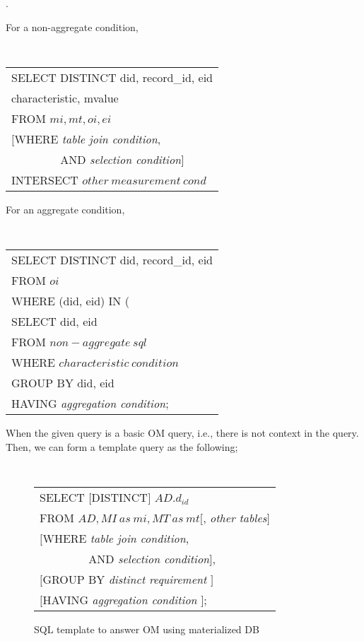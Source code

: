 .


For a non-aggregate condition,

{\tt
\begin{tabular}{l}
SELECT DISTINCT did, record\_id, eid \\
\hspace{0.5in}characteristic, mvalue\\
FROM $mi, mt, oi, ei$\\
$[$WHERE    {\em table join condition}, \\
$\qquad\qquad$ AND {\em selection condition}$]$\\
INTERSECT $other~measurement~cond$\\
\end{tabular}
}

For an aggregate condition,

{\tt
\begin{tabular}{l}
SELECT DISTINCT did, record\_id, eid\\
FROM $oi$\\
WHERE (did, eid) IN (\\
\hspace{0.5in}SELECT did, eid\\
\hspace{0.5in}FROM $non-aggregate~sql$\\
\hspace{0.5in}WHERE $characteristic~condition$\\
\hspace{0.5in}GROUP BY did, eid\\
\hspace{0.5in}HAVING {\em aggregation condition};
\end{tabular}
}
When the given query is a basic OM query, i.e., there is not context
in the query.
Then, we can form a template query as the following;



\begin{figure}[htb]
{\tt
\begin{tabular}{l}
SELECT $[$DISTINCT$]$ $AD.d_{id}$\\
FROM $AD, MI~as~mi, MT~as~mt[$, {\em other tables}$]$\\
$[$WHERE    {\em table join condition}, \\
$\qquad\qquad$ AND {\em selection condition}$]$,\\
$[$GROUP BY {\em distinct requirement} $]$\\
$[$HAVING   {\em aggregation condition} $]$;
\end{tabular}
}
\caption{SQL template to answer OM using materialized DB}
\label{fig:sql_matdb_basic_omq}
\end{figure}

